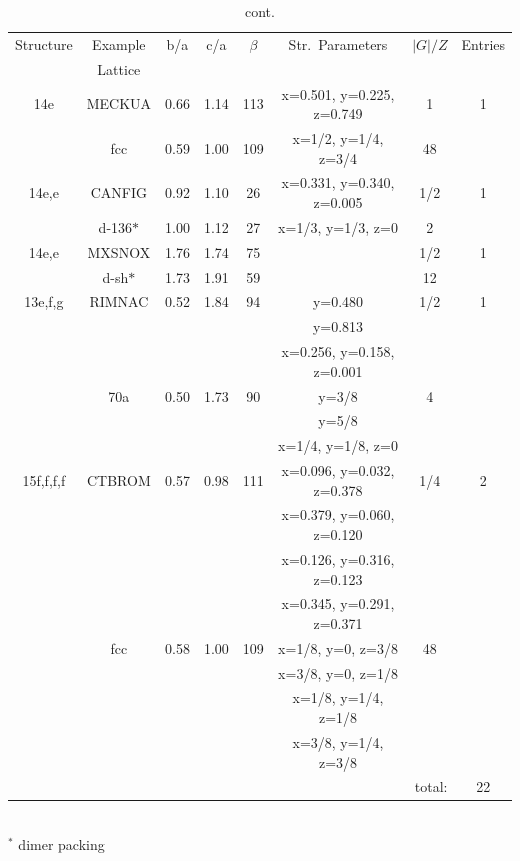 \documentclass[preprint]{revtex4}              %
\begin{document}
\begin{table}
\caption{cont.}
\begin{center}
\begin{tabular}{cccccccc}%
\cline{1-8}
Structure & Example & b/a & c/a & $\beta$ & Str.\ Parameters & $|G|/Z$ & Entries \\
          & Lattice \\
\cline{1-8}
14e     & MECKUA    & 0.66 & 1.14 & 113 & x=0.501, y=0.225, z=0.749 & 1 & 1 \\
        & fcc       & 0.59 & 1.00 & 109 & x=1/2, y=1/4, z=3/4       & 48 \\
14e,e   & CANFIG    & 0.92 & 1.10 & 26  & x=0.331, y=0.340, z=0.005 & 1/2 & 1 \\
        & d-136$*$  & 1.00 & 1.12 & 27  & x=1/3, y=1/3, z=0         & 2 \\
14e,e   & MXSNOX    & 1.76 & 1.74 & 75  & & 1/2 & 1 \\
        & d-sh$*$   & 1.73 & 1.91 & 59  & & 12 \\
13e,f,g & RIMNAC    & 0.52 & 1.84 &  94 & y=0.480 & 1/2 & 1 \\
        &           &      &      &     & y=0.813 \\
        &           &      &      &     & x=0.256, y=0.158, z=0.001 \\
        & 70a       & 0.50 & 1.73 &  90 & y=3/8   & 4 \\
        &           &      &      &     & y=5/8 \\
        &           &      &      &     & x=1/4, y=1/8, z=0 \\
15f,f,f,f  & CTBROM & 0.57 & 0.98 & 111 & x=0.096, y=0.032, z=0.378 & 1/4 & 2 \\
        &           &      &      &     & x=0.379, y=0.060, z=0.120  \\
        &           &      &      &     & x=0.126, y=0.316, z=0.123  \\
        &           &      &      &     & x=0.345, y=0.291, z=0.371  \\
        & fcc       & 0.58 & 1.00 & 109 & x=1/8, y=0, z=3/8          & 48 \\
        &           &      &      &     & x=3/8, y=0, z=1/8  \\
        &           &      &      &     & x=1/8, y=1/4, z=1/8  \\
        &           &      &      &     & x=3/8, y=1/4, z=3/8  \\
\cline{8-8}
\multicolumn{7}{r}{total:} & 22 \\
\cline{1-8}
\end{tabular}\\
$^*$ dimer packing
\end{center}
\end{table}
\end{document}
